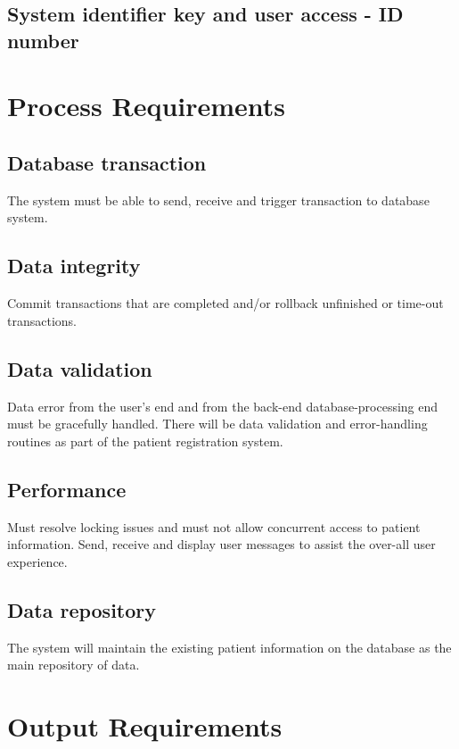 \documentclass[a4paper]{article}
\begin{document}
\subsection{System identifier key and user access - ID number}

\section{Process Requirements}

\subsection{Database transaction}

The system must be able to send, receive and trigger transaction to database system.

\subsection{Data integrity}

Commit transactions that are completed and/or rollback unfinished or time-out transactions.

\subsection{Data validation}

Data error from the user’s end and from the back-end database-processing end must be gracefully handled. There will be data validation and error-handling routines as part of the patient registration system.

\subsection{Performance}

Must resolve locking issues and must not allow concurrent access to patient information. Send, receive and display user messages to assist the over-all user experience.

\subsection{Data repository}

The  system will maintain the existing patient information on the database as the main repository of data.

\section{Output Requirements}
\end{document}
